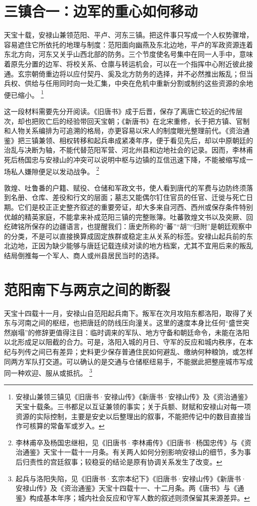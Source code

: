 \section{三镇合一：边军的重心如何移动}
\label{sec:an-lushan-crisis}

天宝十载，安禄山兼领范阳、平卢、河东三镇。把这件事只写成一个人权势骤增，容易遮住它所依托的地理与制度：范阳面向幽燕及东北边地，平卢的军政资源连着东北方向，河东又关乎山西北部的防务。三个节度使名号集中在同一人手中，意味着原先分置的边军、将校关系、仓廪与转运机会，可以在一个指挥中心附近彼此接通。玄宗朝倚重边将以应付契丹、奚及北方防务的选择，并不必然推出叛乱；但当兵权、供给与任用同时向一处汇集，中央在危机中重新分割或制约这些资源的余地便已缩小。%
\footnote{安禄山兼领三镇见《旧唐书·安禄山传》《新唐书·安禄山传》及《资治通鉴》天宝十载条。三书都足以互证兼领的事实；关于兵额、财赋和安禄山对每一项资源的实际控制，主要是安史以后整理出的叙事，不能把传记中的数目直接当作可核算的常备军或岁入。}

这一段材料需要先分开阅读。《旧唐书》成于后晋，保存了离唐亡较近的纪传层次，却也把败亡后的经验带回天宝朝；《新唐书》在北宋重修，长于把方镇、官制和人物关系编排为可追溯的格局，亦更容易以宋人的制度眼光整理前代。《资治通鉴》把三镇兼领、相权转移和起兵串成紧凑年序，便于看见先后，却以中原朝廷的治乱与决断为轴，不能代替范阳军营、河北州县和边地社会的记录。因而，李林甫死后杨国忠与安禄山的冲突可以说明中枢与边镇的互信迅速下降，不能被缩写成一场私人嫌隙便足以发动战争。%
\footnote{李林甫卒及杨国忠继相，见《旧唐书·李林甫传》《旧唐书·杨国忠传》与《资治通鉴》天宝十一载十一月条。有关两人如何分别影响安禄山的细节，多为事后归责性的宫廷叙事；较稳妥的结论是原有协调关系发生了改变。}

敦煌、吐鲁番的户籍、赋役、仓储和军政文书，使人看到唐代的军费与边防终须落到名册、仓库、差役和行文的层面；墓志又能偶尔钉住官员的任官、迁徙与死亡日期。它们是校正正史整齐叙述的重要旁证，却大多来自河西、西州或保存条件特别优越的精英家庭，不能拿来补成范阳三镇的完整账簿。吐蕃敦煌文书以及突厥、回纥碑铭所保存的边疆语言，也提醒我们：唐史所称的“蕃”“胡”“归附”是朝廷观察中的分类，不是可以直接换算成固定族群或稳定主从关系的标签。安禄山起兵前的东北边地，正因为缺少能够与唐廷记载连续对读的地方档案，尤其不宜用后来的叛乱结局倒推每一个军人、商人或州县居民当时的选择。

\section{范阳南下与两京之间的断裂}

天宝十四载十一月，安禄山自范阳起兵南下。叛军在次月攻陷东都洛阳，取得了关东与河南之间的枢纽，也把唐廷的防线压向潼关。这里的速度本身比任何“盛世突然崩塌”的修辞更值得注目：临时调来的军队、地方守备和朝廷命令，未能在洛阳以北形成足以阻截的合力。可是，洛阳入城的月日、守军的反应和城内秩序，在本纪与列传之间已有差异；史料更少保存普通住民如何避乱、缴纳何种粮饷，或怎样同两方军队打交道。可以确认的是交通与仓储枢纽易手，不能据此把整座城市写成同一种欢迎、服从或抵抗。%
\footnote{起兵与洛阳失陷，见《旧唐书·玄宗本纪下》《旧唐书·安禄山传》《新唐书·安禄山传》及《资治通鉴》天宝十四载十一、十二月条。两《唐书》与《通鉴》构成基本年序；城内社会反应和守军人数的叙述则须保留其来源差异。}

